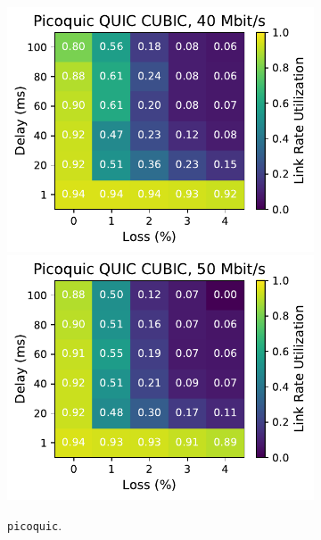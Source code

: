 \begin{figure}[ht]
\begin{subfigure}[b]{0.22\linewidth}
        \includegraphics[width=\linewidth,trim={0 0 2cm 0},clip]{splitting/figures/heatmaps/heatmap_picoquic_cubic_40mbps.pdf}
        \includegraphics[width=\linewidth,trim={0 0 2cm 0},clip]{splitting/figures/heatmaps/heatmap_picoquic_cubic_50mbps.pdf}
        \caption{\texttt{picoquic}.}
    \end{subfigure}
    \begin{subfigure}[b]{0.89cm}

\end{subfigure}
\end{figure}
